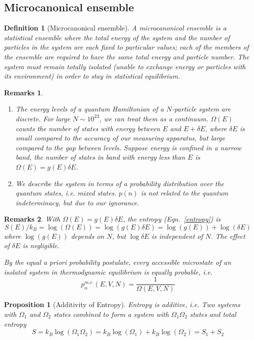 \documentclass[a4paper]{article}
\newtheorem{remarks}{Remarks}[section]
\theoremstyle{new}
\newtheorem{defi}{Definition}[section]
\newtheorem{prop}{Proposition}[section]
\begin{document}
\subsection{Microcanonical ensemble}
\begin{defi}[Microcanonical ensemble]
A microcanonical ensemble is a statistical ensemble where the total energy of the system and the number of particles in the system are each fixed to particular values; each of the members of the ensemble are required to have the same total energy and particle number. The system must remain totally isolated (unable to exchange energy or particles with its environment) in order to stay in statistical equilibrium.
\end{defi}
\begin{remarks}\leavevmode
\begin{enumerate}
\item The energy levels of a quantum Hamiltonian of a $N$-particle system are discrete. For large $N\sim10^{23}$, we can treat them as a continuum. $\Omega(E)$ counts the number of states with energy between $E$ and $E+\delta E$, where $\delta E$ is small compared to the accuracy of our measuring apparatus, but large compared to the gap between levels. Suppose energy is confined in a narrow band, the number of states in band with energy less than $E$ is $\Omega(E)=g(E)\delta E$. 
\item We describe the system in terms of a probability distribution over the quantum states, i.e. mixed states. $p(n)$ is not related to the quantum indeterminacy, but due to our ignorance.
\end{enumerate}
\end{remarks}
\begin{remarks}
With $\Omega(E)=g(E)\delta E$, the entropy (Eqn.~\ref{entropy}) is
$$S(E)/k_B=\log(\Omega(E))=\log(g(E)\delta E)=\log(g(E))+\log(\delta E)$$
where $\log(g(E))$ depends on $N$, but $\log\delta E$ is independent of $N$. The effect of $\delta E$ is negligible.
\item By the equal a priori probability postulate, every accessible microstate of an isolated system in thermodynamic equilibrium is equally probable, i.e.
$$p_\alpha^{m.c.}(E,V,N)=\frac{1}{\Omega(E,V,N)}$$
\end{remarks}
\begin{prop}[Additivity of Entropy]
Entropy is additive, i.e.
Two systems with $\Omega_1$ and $\Omega_2$ states combined to form a system with $\Omega_1\Omega_2$ states and total entropy
$$S=k_B\log(\Omega_1\Omega_2)=k_B\log(\Omega_1)+k_B\log(\Omega_2)=S_1+S_2$$
\end{prop}
\end{document}
